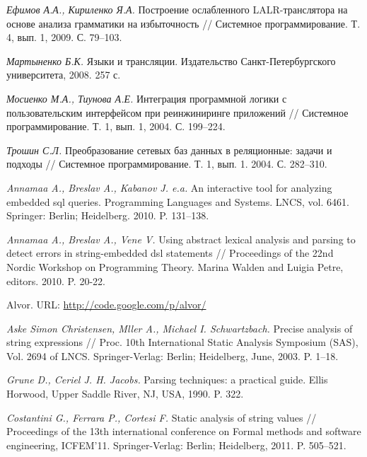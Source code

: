 \documentclass[a5paper]{article}
\begin{document}
\begin{thebibliography}{99}
  
\emph{Ефимов А.А., Кириленко Я.А.} Построение ослабленного LALR-транслятора на основе анализа грамматики на избыточность // Системное программирование. Т. 4, вып. 1, 2009. С. 79–103.  

\emph{Мартыненко Б.К.} Языки и трансляции. Издательство Санкт-Петербургского университета, 2008. 257 с. 

\emph{Мосиенко М.А., Тиунова А.Е.} Интеграция программной логики с пользовательским интерфейсом при реинжиниринге приложений // Системное программирование. Т. 1, вып. 1, 2004. С. 199–224.

\emph{Трошин С.Л.} Преобразование сетевых баз данных в реляционные: задачи и подходы // Системное программирование. Т. 1, вып. 1. 2004. С. 282–310.

\emph{Annamaa A., Breslav A., Kabanov J. e.a.} An interactive tool for analyzing embedded sql queries. Programming Languages and Systems. LNCS, vol. 6461. Springer: Berlin; Heidelberg. 2010. P. 131–138.

\emph{Annamaa A., Breslav A., Vene V.} Using abstract lexical analysis and parsing to detect errors in string-embedded dsl statements // Proceedings of the 22nd Nordic Workshop on Programming Theory. Marina Walden and Luigia Petre, editors. 2010. P. 20-22.

Alvor. URL:  \href{http://code.google.com/p/alvor/}{http://code.google.com/p/alvor/}

\emph{Aske Simon Christensen, Mller A., Michael I. Schwartzbach.} Precise analysis of string expressions // Proc. 10th International Static Analysis Symposium (SAS), Vol. 2694 of LNCS. Springer-Verlag: Berlin; Heidelberg, June, 2003. P. 1–18.

\emph{Grune D., Ceriel J. H. Jacobs.} Parsing techniques: a practical guide. Ellis Horwood, Upper Saddle River, NJ, USA, 1990. P. 322.

\emph{Costantini G., Ferrara P., Cortesi F.} Static analysis of string values // Proceedings of the 13th international conference on Formal methods and software engineering, ICFEM’11. Springer-Verlag: Berlin; Heidelberg, 2011. P. 505–521.


\end{thebibliography}
\end{document}
